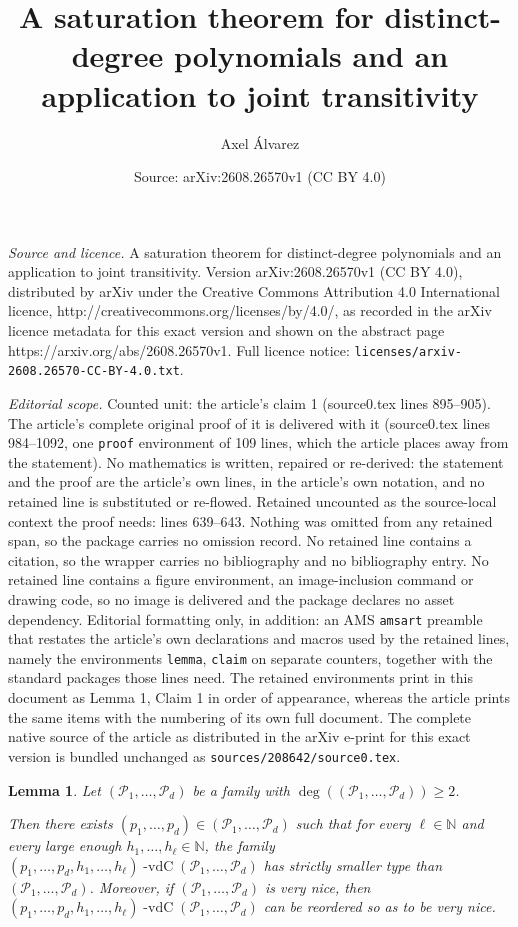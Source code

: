 \documentclass[10pt,a4paper]{amsart}
\title{A saturation theorem for distinct-degree polynomials and an application to joint transitivity}
\author{Axel \'Alvarez}
\date{Source: arXiv:2608.26570v1 (CC BY 4.0)}
\newtheorem{lemma}{Lemma}
\newcommand{\N}{\mathbb{N}}
\newcommand{\cP}{{\mathcal P}}
\DeclareMathOperator{\vdc}{-vdC}
\begin{document}
\maketitle

\noindent\emph{Source and licence.} A saturation theorem for distinct-degree polynomials and an application to joint transitivity. Version arXiv:2608.26570v1 (CC BY 4.0), distributed by arXiv under the Creative Commons Attribution 4.0 International licence, http://creativecommons.org/licenses/by/4.0/, as recorded in the arXiv licence metadata for this exact version and shown on the abstract page https://arxiv.org/abs/2608.26570v1. Full licence notice: \texttt{licenses/arxiv-2608.26570-CC-BY-4.0.txt}.\par\smallskip

\noindent\textit{Editorial scope.} Counted unit: the article's claim 1 (source0.tex lines 895--905). The article's complete original proof of it is delivered with it (source0.tex lines 984--1092, one \texttt{proof} environment of 109 lines, which the article places away from the statement). No mathematics is written, repaired or re-derived: the statement and the proof are the article's own lines, in the article's own notation, and no retained line is substituted or re-flowed.  Retained uncounted as the source-local context the proof needs: lines 639--643.  Nothing was omitted from any retained span, so the package carries no omission record.  No retained line contains a citation, so the wrapper carries no bibliography and no bibliography entry.  No retained line contains a figure environment, an image-inclusion command or drawing code, so no image is delivered and the package declares no asset dependency.  Editorial formatting only, in addition: an AMS \texttt{amsart} preamble that restates the article's own declarations and macros used by the retained lines, namely the environments \texttt{lemma}, \texttt{claim} on separate counters, together with the standard packages those lines need.  The retained environments print in this document as Lemma 1, Claim 1 in order of appearance, whereas the article prints the same items with the numbering of its own full document.  The complete native source of the article as distributed in the arXiv e-print for this exact version is bundled unchanged as \texttt{sources/208642/source0.tex}.
\begin{lemma}\label{lemma: reduce_type}
Let $(\cP_1,\ldots, \cP_d)$ be a family with $\deg((\cP_1,\dots,\cP_d))\geq 2$. 

Then there exists $(p_1,\ldots,p_d)\in (\cP_1,\ldots,\cP_d)$ such that for every $\ell\in\mathbb N$ and every large enough $h_1,\dots,h_\ell\in\N$, the family  $(p_1,\ldots,p_d,h_1,\dots,h_\ell)\vdc(\cP_1,\ldots, \cP_d)$ has strictly smaller type than $(\cP_1,\ldots, \cP_d)$. Moreover, if $(\cP_1,\ldots,\cP_d)$ is very nice, then $(p_1,\ldots,p_d,h_1,\dots,h_\ell)\vdc(\cP_1,\ldots, \cP_d)$ can be reordered so as to be very nice.
\end{lemma}
\end{document}
